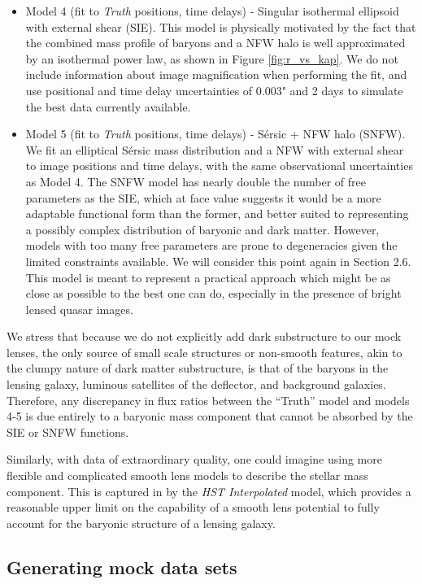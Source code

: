 \begin{itemize}
	\item Model 4 (fit to \textit{Truth} positions, time delays) - Singular isothermal ellipsoid with external shear (SIE). This model is physically motivated by the fact that the combined mass profile of baryons and a NFW halo is well approximated by an isothermal power law, as shown in Figure \ref{fig:r_vs_kap}. We do not include information about image magnification when performing the fit, and use positional and time delay uncertainties of 0.003" and 2 days to simulate the best data currently available.
	\item Model 5 (fit to \textit{Truth} positions, time delays) - S{\'e}rsic + NFW halo (SNFW). We fit an elliptical S{\'e}rsic \citep{Sersic63} mass distribution and a NFW with external shear to image positions and time delays, with the same observational uncertainties as Model 4. The SNFW model has nearly double the number of free parameters as the SIE, which at face value suggests it would be a more adaptable functional form than the former, and better suited to representing a possibly complex distribution of baryonic and dark matter. However, models with too many free parameters are prone to degeneracies given the limited constraints available. We will consider this point again in Section 2.6. This model is meant to represent a practical approach which might be as close as possible to the best one can do, especially in the presence of bright lensed quasar images. 
\end{itemize}

We stress that because we do not explicitly add dark substructure to our mock lenses, the only source of small scale structures or non-smooth features, akin to the clumpy nature of dark matter substructure, is that of the baryons in the lensing galaxy, luminous satellites of the deflector, and background galaxies. Therefore, any discrepancy in flux ratios between the ``Truth'' model and models 4-5 is due entirely to a baryonic mass component that cannot be absorbed by the SIE or SNFW functions.

Similarly, with data of extraordinary quality, one could imagine using more flexible and complicated smooth lens models to describe the stellar mass component. This is captured in by the \textit{HST Interpolated} model, which provides a reasonable upper limit on the capability of a smooth lens potential to fully account for the baryonic structure of a lensing galaxy.

\subsection{Generating mock data sets}
\label{ssec:mocks}

